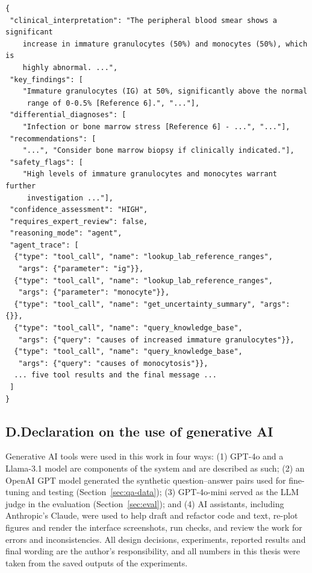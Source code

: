 \begin{lstlisting}
{
 "clinical_interpretation": "The peripheral blood smear shows a significant
    increase in immature granulocytes (50%) and monocytes (50%), which is
    highly abnormal. ...",
 "key_findings": [
    "Immature granulocytes (IG) at 50%, significantly above the normal
     range of 0-0.5% [Reference 6].", "..."],
 "differential_diagnoses": [
    "Infection or bone marrow stress [Reference 6] - ...", "..."],
 "recommendations": [
    "...", "Consider bone marrow biopsy if clinically indicated."],
 "safety_flags": [
    "High levels of immature granulocytes and monocytes warrant further
     investigation ..."],
 "confidence_assessment": "HIGH",
 "requires_expert_review": false,
 "reasoning_mode": "agent",
 "agent_trace": [
  {"type": "tool_call", "name": "lookup_lab_reference_ranges",
   "args": {"parameter": "ig"}},
  {"type": "tool_call", "name": "lookup_lab_reference_ranges",
   "args": {"parameter": "monocyte"}},
  {"type": "tool_call", "name": "get_uncertainty_summary", "args": {}},
  {"type": "tool_call", "name": "query_knowledge_base",
   "args": {"query": "causes of increased immature granulocytes"}},
  {"type": "tool_call", "name": "query_knowledge_base",
   "args": {"query": "causes of monocytosis"}},
  ... five tool results and the final message ...
 ]
}
\end{lstlisting}

\subsection*{D.\quad Declaration on the use of generative AI}

Generative AI tools were used in this work in four ways: (1) GPT-4o and a Llama-3.1 model are components of the system and are described as such; (2) an OpenAI GPT model generated the synthetic question--answer pairs used for fine-tuning and testing (Section~\ref{sec:qa-data}); (3) GPT-4o-mini served as the LLM judge in the evaluation (Section~\ref{sec:eval}); and (4) AI assistants, including Anthropic's Claude, were used to help draft and refactor code and text, re-plot figures and render the interface screenshots, run checks, and review the work for errors and inconsistencies. All design decisions, experiments, reported results and final wording are the author's responsibility, and all numbers in this thesis were taken from the saved outputs of the experiments.
